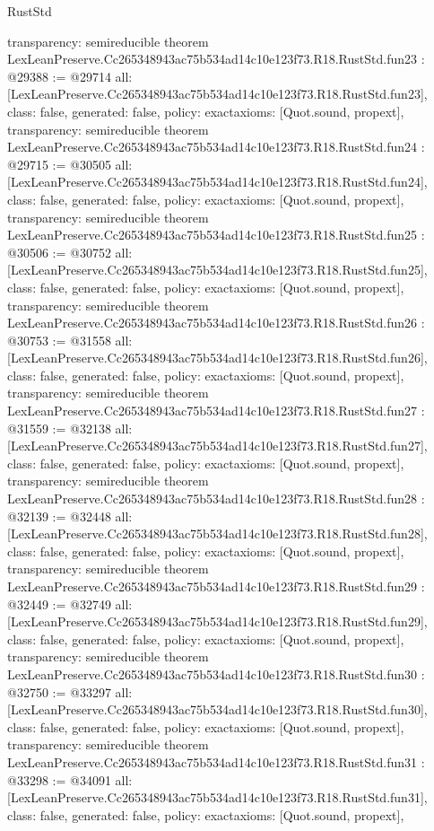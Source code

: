\begin{lexlean}{RustStd}
\begin{coremodule}
{  transparency: semireducible
}
theorem LexLeanPreserve.Cc265348943ac75b534ad14c10e123f73.R18.RustStd.fun23 : @29388 := @29714 {
  all: [LexLeanPreserve.Cc265348943ac75b534ad14c10e123f73.R18.RustStd.fun23],
  class: false,
  generated: false,
  policy: exact{axioms: [Quot.sound, propext]},
  transparency: semireducible
}
theorem LexLeanPreserve.Cc265348943ac75b534ad14c10e123f73.R18.RustStd.fun24 : @29715 := @30505 {
  all: [LexLeanPreserve.Cc265348943ac75b534ad14c10e123f73.R18.RustStd.fun24],
  class: false,
  generated: false,
  policy: exact{axioms: [Quot.sound, propext]},
  transparency: semireducible
}
theorem LexLeanPreserve.Cc265348943ac75b534ad14c10e123f73.R18.RustStd.fun25 : @30506 := @30752 {
  all: [LexLeanPreserve.Cc265348943ac75b534ad14c10e123f73.R18.RustStd.fun25],
  class: false,
  generated: false,
  policy: exact{axioms: [Quot.sound, propext]},
  transparency: semireducible
}
theorem LexLeanPreserve.Cc265348943ac75b534ad14c10e123f73.R18.RustStd.fun26 : @30753 := @31558 {
  all: [LexLeanPreserve.Cc265348943ac75b534ad14c10e123f73.R18.RustStd.fun26],
  class: false,
  generated: false,
  policy: exact{axioms: [Quot.sound, propext]},
  transparency: semireducible
}
theorem LexLeanPreserve.Cc265348943ac75b534ad14c10e123f73.R18.RustStd.fun27 : @31559 := @32138 {
  all: [LexLeanPreserve.Cc265348943ac75b534ad14c10e123f73.R18.RustStd.fun27],
  class: false,
  generated: false,
  policy: exact{axioms: [Quot.sound, propext]},
  transparency: semireducible
}
theorem LexLeanPreserve.Cc265348943ac75b534ad14c10e123f73.R18.RustStd.fun28 : @32139 := @32448 {
  all: [LexLeanPreserve.Cc265348943ac75b534ad14c10e123f73.R18.RustStd.fun28],
  class: false,
  generated: false,
  policy: exact{axioms: [Quot.sound, propext]},
  transparency: semireducible
}
theorem LexLeanPreserve.Cc265348943ac75b534ad14c10e123f73.R18.RustStd.fun29 : @32449 := @32749 {
  all: [LexLeanPreserve.Cc265348943ac75b534ad14c10e123f73.R18.RustStd.fun29],
  class: false,
  generated: false,
  policy: exact{axioms: [Quot.sound, propext]},
  transparency: semireducible
}
theorem LexLeanPreserve.Cc265348943ac75b534ad14c10e123f73.R18.RustStd.fun30 : @32750 := @33297 {
  all: [LexLeanPreserve.Cc265348943ac75b534ad14c10e123f73.R18.RustStd.fun30],
  class: false,
  generated: false,
  policy: exact{axioms: [Quot.sound, propext]},
  transparency: semireducible
}
theorem LexLeanPreserve.Cc265348943ac75b534ad14c10e123f73.R18.RustStd.fun31 : @33298 := @34091 {
  all: [LexLeanPreserve.Cc265348943ac75b534ad14c10e123f73.R18.RustStd.fun31],
  class: false,
  generated: false,
  policy: exact{axioms: [Quot.sound, propext]},
}
\end{coremodule}
\end{lexlean}
